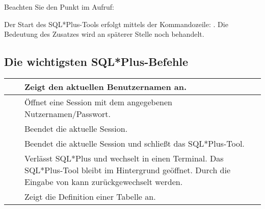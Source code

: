         \begin{merke}
          Beachten Sie den Punkt im Aufruf: 
        \end{merke}
        Der Start des SQL*Plus-Tools erfolgt mittels der Kommandozeile: . Die Bedeutung des Zusatzes  wird an späterer Stelle noch behandelt.
      \subsection{Die wichtigsten SQL*Plus-Befehle}
        \begin{center}
          \label{importantsqlpluscommands}
          \begin{small}
            \tabletail{
              \hline
            }
            \tablelasttail {
              \hline
            }
            \begin{supertabular}{|p{4.25cm}|p{4.25cm}|p{6.25cm}|}
               &  & Zeigt den aktuellen Benutzernamen an. \\
              \hline
               &  & Öffnet eine Session mit dem angegebenen Nutzernamen/Passwort. \\
              \hline
               &  & Beendet die aktuelle Session. \\
              \hline
               &  & Beendet die aktuelle Session und schließt das SQL*Plus-Tool. \\
              \hline
               &  & Verlässt SQL*Plus und wechselt in einen Terminal. Das SQL*Plus-Tool bleibt im Hintergrund geöffnet. Durch die Eingabe von  kann zurückgewechselt werden. \\
              \hline
               &  & Zeigt die Definition einer Tabelle an. \\

\end{supertabular}
\end{small}
\end{center}
